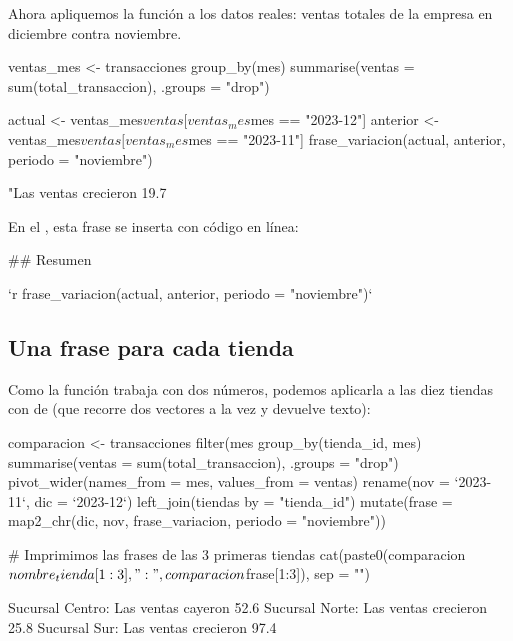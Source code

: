 Ahora apliquemos la función a los datos reales: ventas totales de la
empresa en diciembre contra noviembre.

\begin{rcode}
ventas_mes <- transacciones %
  group_by(mes) %
  summarise(ventas = sum(total_transaccion), .groups = "drop")

actual   <- ventas_mes$ventas[ventas_mes$mes == "2023-12"]
anterior <- ventas_mes$ventas[ventas_mes$mes == "2023-11"]
frase_variacion(actual, anterior, periodo = "noviembre")
\end{rcode}
\begin{rsalida}
[1] "Las ventas crecieron 19.7%
\end{rsalida}

En el , esta frase se inserta con código en línea:

\begin{textocodigo}
## Resumen

`r frase_variacion(actual, anterior, periodo = "noviembre")`
\end{textocodigo}

\subsection{Una frase para cada tienda}

Como la función trabaja con dos números, podemos aplicarla a las diez
tiendas con  de  (que recorre dos vectores
a la vez y devuelve texto):

\begin{rcode}
comparacion <- transacciones %
  filter(mes %
  group_by(tienda_id, mes) %
  summarise(ventas = sum(total_transaccion), .groups = "drop") %
  pivot_wider(names_from = mes, values_from = ventas) %
  rename(nov = `2023-11`, dic = `2023-12`) %
  left_join(tiendas %
            by = "tienda_id") %
  mutate(frase = map2_chr(dic, nov, frase_variacion,
                          periodo = "noviembre"))

# Imprimimos las frases de las 3 primeras tiendas
cat(paste0(comparacion$nombre_tienda[1:3], ": ",
           comparacion$frase[1:3]), sep = "\n")
\end{rcode}
\begin{rsalida}
Sucursal Centro: Las ventas cayeron 52.6%
Sucursal Norte: Las ventas crecieron 25.8%
Sucursal Sur: Las ventas crecieron 97.4%
\end{rsalida}

